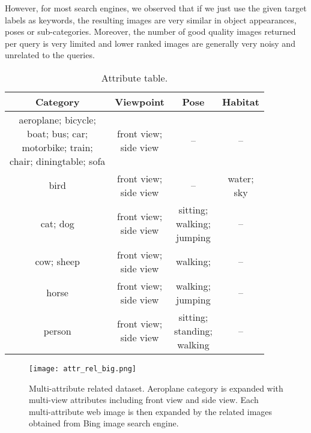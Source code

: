 \documentclass[10pt,twocolumn,letterpaper]{article}
\begin{document}
However, for most search engines, we observed that if we just use the given target labels as keywords, the resulting images are very similar in object appearances, poses or sub-categories. Moreover, the number of good quality images returned per query is very limited and lower ranked images are generally very noisy and unrelated to the queries.



\begin{table}
\small
\centering
\setlength\tabcolsep{4pt}
\caption{Attribute table.}\label{tb:attr_table}
\begin{tabular}{c|ccc}

\hline
Category&Viewpoint&Pose&Habitat\\
\hline
\hline
\makecell{aeroplane; bicycle;\\ boat; bus; car; \\motorbike; train; \\chair; diningtable; sofa } & \makecell{front view;\\side view }& -- & --\\
\hline
bird&\makecell{front view;\\side view} & -- &\makecell{water;\\ sky}\\
\hline
cat; dog &\makecell{front view;\\side view} & \makecell{sitting;\\walking;\\jumping} & --\\
\hline
cow; sheep& \makecell{front view;\\side view} &walking;& --\\
\hline
horse &\makecell{front view;\\side view} &\makecell{walking;\\jumping}& --\\
\hline
person &\makecell{front view;\\side view} &\makecell{sitting;\\standing;\\walking}& --\\
\hline
\end{tabular}
\end{table}

\begin{figure*}[t]
\texttt{[image: attr\_rel\_big.png]}
\caption{Multi-attribute related dataset. Aeroplane category is expanded with multi-view attributes including front view and side view. Each multi-attribute web image is then expanded by the related images obtained from Bing image search engine.}
\label{fig:attr_rel}
\end{figure*}
\end{document}
